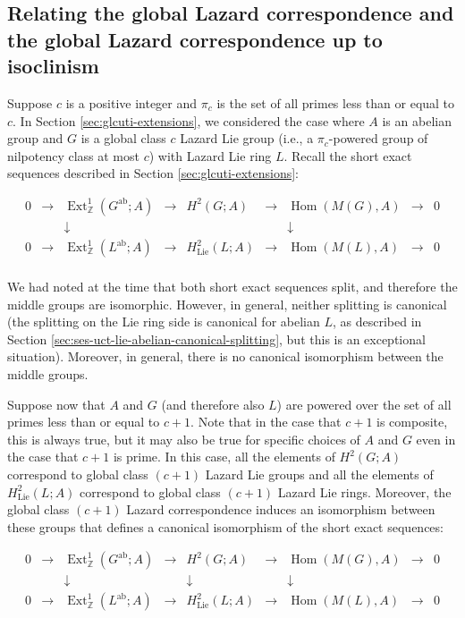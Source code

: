 \subsection{Relating the global Lazard correspondence and the global Lazard correspondence up to isoclinism}

Suppose $c$ is a positive integer and $\pi_c$ is the set of all primes
less than or equal to $c$. In Section \ref{sec:glcuti-extensions}, we
considered the case where $A$ is an abelian group and $G$ is a global
class $c$ Lazard Lie group (i.e., a $\pi_c$-powered group of nilpotency
class at most $c$) with Lazard Lie ring $L$. Recall the short exact
sequences described in Section \ref{sec:glcuti-extensions}:

$$\begin{array}{ccccccccc}
  0 &\to &\operatorname{Ext}^1_{\mathbb{Z}}(G^{\operatorname{ab}};A) &\to &H^2(G;A) &\to &\operatorname{Hom}(M(G),A) &\to &0\\
  & & \downarrow & & & & \downarrow & & \\
  0 &\to &\operatorname{Ext}^1_{\mathbb{Z}}(L^{\operatorname{ab}};A) & \to & H^2_{\text{Lie}}(L;A) & \to & \operatorname{Hom}(M(L), A) & \to & 0\\
\end{array}$$

We had noted at the time that both short exact sequences split, and
therefore the middle groups are isomorphic. However, in general,
neither splitting is canonical (the splitting on the Lie ring side is
canonical for abelian $L$, as described in Section
\ref{sec:ses-uct-lie-abelian-canonical-splitting}, but this is an exceptional
situation). Moreover, in general, there is no canonical isomorphism
between the middle groups.

Suppose now that $A$ and $G$ (and therefore also $L$) are powered over
the set of all primes less than or equal to $c + 1$. Note that in the
case that $c + 1$ is composite, this is always true, but it may also
be true for specific choices of $A$ and $G$ even in the case that $c +
1$ is prime. In this case, all the elements of $H^2(G;A)$ correspond
to global class $(c + 1)$ Lazard Lie groups and all the elements of
$H^2_{\text{Lie}}(L;A)$ correspond to global class $(c + 1)$ Lazard
Lie rings. Moreover, the global class $(c + 1)$ Lazard correspondence
induces an isomorphism between these groups that defines a canonical
isomorphism of the short exact sequences:

$$\begin{array}{ccccccccc}
  0 &\to &\operatorname{Ext}^1_{\mathbb{Z}}(G^{\operatorname{ab}};A) &\to &H^2(G;A) &\to &\operatorname{Hom}(M(G),A) &\to &0\\
  & & \downarrow & & \downarrow & & \downarrow & & \\
  0 &\to &\operatorname{Ext}^1_{\mathbb{Z}}(L^{\operatorname{ab}};A) & \to & H^2_{\text{Lie}}(L;A) & \to & \operatorname{Hom}(M(L), A) & \to & 0\\
\end{array}$$

